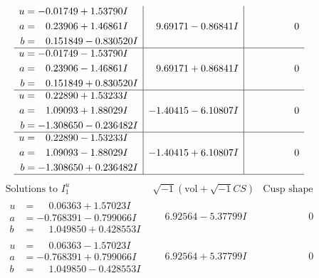 \documentclass[1p]{elsarticle_modified}
\theoremstyle{definition}
\newcommand{\I}{\sqrt{-1}}
\begin{document}
$$\begin{array}{c|c|c}
\begin{aligned}
u &= -0.01749 + 1.53790 I \\
a &= \phantom{-}0.23906 + 1.46861 I \\
b &= \phantom{-}0.151849 - 0.830520 I\end{aligned}
 & \phantom{-}9.69171 - 0.86841 I & \phantom{-0.000000 } 0 \\ \hline\begin{aligned}
u &= -0.01749 - 1.53790 I \\
a &= \phantom{-}0.23906 - 1.46861 I \\
b &= \phantom{-}0.151849 + 0.830520 I\end{aligned}
 & \phantom{-}9.69171 + 0.86841 I & \phantom{-0.000000 } 0 \\ \hline\begin{aligned}
u &= \phantom{-}0.22890 + 1.53233 I \\
a &= \phantom{-}1.09093 + 1.88029 I \\
b &= -1.308650 - 0.236482 I\end{aligned}
 & -1.40415 - 6.10807 I & \phantom{-0.000000 } 0 \\ \hline\begin{aligned}
u &= \phantom{-}0.22890 - 1.53233 I \\
a &= \phantom{-}1.09093 - 1.88029 I \\
b &= -1.308650 + 0.236482 I\end{aligned}
 & -1.40415 + 6.10807 I & \phantom{-0.000000 } 0\\
 \hline 
 \end{array}$$\newpage$$\begin{array}{c|c|c}  
\text{Solutions to }I^u_{1}& \I (\text{vol} + \sqrt{-1}CS) & \text{Cusp shape}\\
 \hline 
\begin{aligned}
u &= \phantom{-}0.06363 + 1.57023 I \\
a &= -0.768391 - 0.799066 I \\
b &= \phantom{-}1.049850 + 0.428553 I\end{aligned}
 & \phantom{-}6.92564 - 5.37799 I & \phantom{-0.000000 } 0 \\ \hline\begin{aligned}
u &= \phantom{-}0.06363 - 1.57023 I \\
a &= -0.768391 + 0.799066 I \\
b &= \phantom{-}1.049850 - 0.428553 I\end{aligned}
 & \phantom{-}6.92564 + 5.37799 I & \phantom{-0.000000 } 0 \\ \hline\begin{aligned}

\end{aligned}
\end{array}$$
\end{document}
